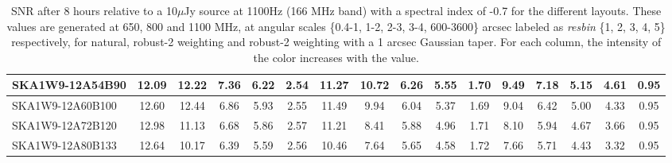 \begin{table}[H]
{{\begin{tabular}{|lccccc||ccccc||ccccc|}
SKA1W9-12A54B90 & 12.09 \cellcolor{blue!49.65} & 12.22 \cellcolor{red!58.04} & 7.36 \cellcolor{green!60.00} & 6.22 \cellcolor{orange!60.00} & 2.54 \cellcolor{purple!18.00} & 11.27 \cellcolor{blue!57.23} & 10.72 \cellcolor{red!60.00} & 6.26 \cellcolor{green!60.00} & 5.55 \cellcolor{orange!60.00} & 1.70 \cellcolor{purple!22.20} & 9.49 \cellcolor{blue!60.00} & 7.18 \cellcolor{red!60.00} & 5.15 \cellcolor{green!60.00} & 4.61 \cellcolor{orange!60.00} & 0.95 \cellcolor{purple!18.00}\\ \hline 
SKA1W9-12A60B100 & 12.60 \cellcolor{blue!55.58} & 12.44 \cellcolor{red!60.00} & 6.86 \cellcolor{green!45.62} & 5.93 \cellcolor{orange!41.82} & 2.55 \cellcolor{purple!21.82} & 11.49 \cellcolor{blue!60.00} & 9.94 \cellcolor{red!52.05} & 6.04 \cellcolor{green!50.17} & 5.37 \cellcolor{orange!52.21} & 1.69 \cellcolor{purple!18.00} & 9.04 \cellcolor{blue!53.72} & 6.42 \cellcolor{red!42.93} & 5.00 \cellcolor{green!51.25} & 4.33 \cellcolor{orange!50.88} & 0.95 \cellcolor{purple!18.00}\\ \hline 
SKA1W9-12A72B120 & 12.98 \cellcolor{blue!60.00} & 11.13 \cellcolor{red!48.34} & 6.68 \cellcolor{green!40.44} & 5.86 \cellcolor{orange!37.43} & 2.57 \cellcolor{purple!29.45} & 11.21 \cellcolor{blue!56.48} & 8.41 \cellcolor{red!36.45} & 5.88 \cellcolor{green!43.02} & 4.96 \cellcolor{orange!34.45} & 1.71 \cellcolor{purple!26.40} & 8.10 \cellcolor{blue!40.60} & 5.94 \cellcolor{red!32.15} & 4.67 \cellcolor{green!32.00} & 3.66 \cellcolor{orange!29.07} & 0.95 \cellcolor{purple!18.00}\\ \hline 
SKA1W9-12A80B133 & 12.64 \cellcolor{blue!56.04} & 10.17 \cellcolor{red!39.80} & 6.39 \cellcolor{green!32.10} & 5.59 \cellcolor{orange!20.51} & 2.56 \cellcolor{purple!25.64} & 10.46 \cellcolor{blue!47.05} & 7.64 \cellcolor{red!28.60} & 5.65 \cellcolor{green!32.74} & 4.58 \cellcolor{orange!18.00} & 1.72 \cellcolor{purple!30.60} & 7.66 \cellcolor{blue!34.47} & 5.71 \cellcolor{red!26.98} & 4.43 \cellcolor{green!18.00} & 3.32 \cellcolor{orange!18.00} & 0.95 \cellcolor{purple!18.00}\\ \hline 
\end{tabular}}
\vspace{-0.300000cm}
\hspace{1cm} 

\vspace{.50cm}
\caption{SNR after 8 hours relative to a 10$\mu$Jy source at 1100Hz (166 MHz band) with a spectral index of -0.7 for the different layouts. These values are generated at 650, 800 and 1100 MHz, at angular scales \{0.4-1, 1-2, 2-3, 3-4, 600-3600\} arcsec labeled as {\it resbin} \{1, 2, 3, 4, 5\} respectively, for natural, robust-2 weighting and robust-2 weighting with a 1 arcsec Gaussian taper. For each column, the intensity of the color increases with the value.}\label{tab:snr10}}
 \end{table}
